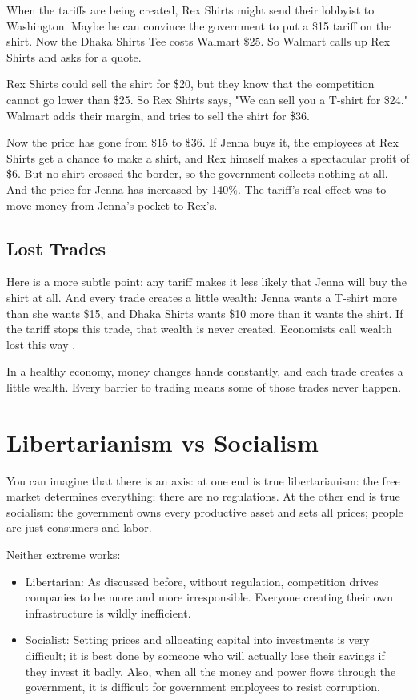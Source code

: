 When the tariffs are being created, Rex Shirts might send their lobbyist to Washington.  Maybe he can convince the government to put a \$15 tariff on the shirt. Now the Dhaka Shirts Tee costs Walmart \$25. So Walmart calls up Rex Shirts and asks for a quote.

Rex Shirts could sell the shirt for \$20, but they know that the competition cannot go lower than \$25.  So Rex Shirts says, "We can sell you a T-shirt for \$24."  Walmart adds their margin, and tries to sell the shirt for \$36.

Now the price has gone from \$15 to \$36. If Jenna buys it, the employees
at Rex Shirts get a chance to make a shirt, and Rex himself makes a
spectacular profit of \$6. But no shirt crossed the border, so the
government collects nothing at all. And the price for Jenna has increased
by 140\%. The tariff's real effect was to move money from Jenna's pocket to
Rex's.

\subsection{Lost Trades}

Here is a more subtle point: any tariff makes it less likely that Jenna
will buy the shirt at all. And every trade creates a little wealth: Jenna
wants a T-shirt more than she wants \$15, and Dhaka Shirts wants \$10 more
than it wants the shirt. If the tariff stops this trade, that wealth is
never created. Economists call wealth lost this way .

In a healthy economy, money changes hands constantly, and each trade
creates a little wealth. Every barrier to trading means some of those
trades never happen.

\section{Libertarianism vs Socialism}

You can imagine that there is an axis: at one end is true libertarianism: the free market determines everything; there are no regulations.  At the other end is true socialism: the government owns every productive asset and sets all prices; people are just consumers and labor.

Neither extreme works:
\begin{itemize}
\item Libertarian: As discussed before, without regulation, competition drives companies to be more and more irresponsible. Everyone creating their own infrastructure is wildly inefficient.
\item Socialist: Setting prices and allocating capital into investments is very difficult; it is best done by someone who will actually lose their savings if they invest it badly. Also, when all the money and power flows through the government, it is difficult for government employees to resist corruption.
\end{itemize}

